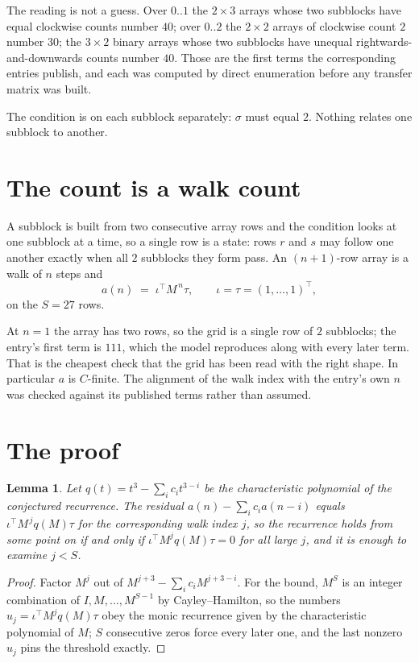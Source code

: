 \documentclass[11pt,a4paper]{article}
\theoremstyle{plain}
\newtheorem{lemma}[theorem]{Lemma}
\theoremstyle{definition}
\begin{document}
The reading is not a guess. Over $0..1$ the $2\times3$ arrays whose two subblocks have equal
clockwise counts number $40$; over $0..2$ the $2\times2$ arrays of clockwise count $2$ number
$30$; the $3\times2$ binary arrays whose two subblocks have unequal rightwards-and-downwards
counts number $40$. Those are the first terms the corresponding entries publish, and each was
computed by direct enumeration before any transfer matrix was built.

The condition is on each subblock separately: $\sigma$ must equal $2$. Nothing
relates one subblock to another.

\section{The count is a walk count}

A subblock is built from two consecutive array rows and the condition looks
at one subblock at a time, so a single row is a state: rows $r$ and $s$ may follow one another
exactly when all $2$ subblocks they form pass. An $(n+1)$-row array is a walk of $n$ steps and
\[
a(n)\;=\;\iota^{\!\top}M^{\,n}\tau,\qquad\iota=\tau=(1,\dots,1)^{\!\top},
\]
on the $S=27$ rows.

At $n=1$ the array has two rows, so the grid is a single row of $2$
subblocks; the entry's first term is $111$, which the model
reproduces along with every later term. That is the cheapest check that the grid has been read
with the right shape.
In particular $a$ is $C$-finite. The alignment of the walk index with the entry's own $n$ was
checked against its published terms rather than assumed.

\section{The proof}

\begin{lemma}\label{lem:crit}
Let $q(t)=t^{3}-\sum_i c_it^{3-i}$ be the characteristic polynomial of the
conjectured recurrence. The residual $a(n)-\sum_ic_ia(n-i)$ equals
$\iota^{\!\top}M^{\,j}q(M)\tau$ for the corresponding walk index $j$, so the recurrence
holds from some point on if and only if $\iota^{\!\top}M^{j}q(M)\tau=0$ for all large $j$,
and it is enough to examine $j<S$.
\end{lemma}

\begin{proof}
Factor $M^{j}$ out of $M^{j+3}-\sum_ic_iM^{j+3-i}$. For the bound, $M^{S}$
is an integer combination of $I,M,\dots,M^{S-1}$ by Cayley--Hamilton, so the numbers
$u_j=\iota^{\!\top}M^{j}q(M)\tau$ obey the monic recurrence given by the characteristic
polynomial of $M$; $S$ consecutive zeros force every later one, and the last nonzero $u_j$
pins the threshold exactly.
\end{proof}
\end{document}
